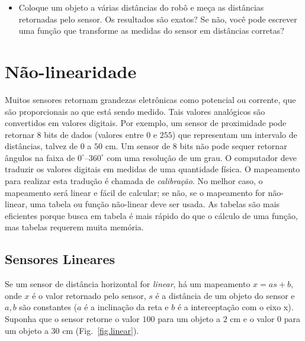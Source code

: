 \begin{framed}
\begin{itemize}
\item Coloque um objeto a várias distâncias do robô e meça as distâncias retornadas pelo sensor. Os resultados são exatos? Se não, você pode escrever uma função que transforme as medidas do sensor em distâncias corretas?
\end{itemize}
\end{framed}









\section{Não-linearidade}\label{s.nonlinearity}

Muitos sensores retornam grandezas eletrônicas como potencial ou corrente, que são proporcionais ao que está sendo medido. Tais valores analógicos são convertidos em valores digitais. Por exemplo, um sensor de proximidade pode retornar $8$ bits de dados (valores entre $0$ e $255$) que representam um intervalo de distâncias, talvez de $0$ a $50$ cm. Um sensor de $8$ bits não pode sequer retornar ângulos na faixa de $0^{\circ}$--$360^{\circ}$ com uma resolução de um grau. O computador deve traduzir os valores digitais em medidas de uma quantidade física. O mapeamento para realizar esta tradução é chamada de \emph{calibração}. No melhor caso, o mapeamento será linear e fácil de calcular; se não, se o mapeamento for não-linear, uma tabela ou função não-linear deve ser usada. As tabelas são mais eficientes porque busca em tabela é mais rápido do que o cálculo de uma função, mas tabelas requerem muita memória.

\subsection{Sensores Lineares}

Se um sensor de distância horizontal for \emph{linear}, há um mapeamento $x = a s + b$, onde $x$ é o valor retornado pelo sensor, $s$ é a distância de um objeto do sensor e $a,b$ são constantes ($a$ é a inclinação da reta e $b$ é a interceptação com o eixo x). Suponha que o sensor retorne o valor $100$ para um objeto a $2$ cm e o valor $0$ para um objeto a $30$ cm (Fig.~\ref{fig.linear}).

